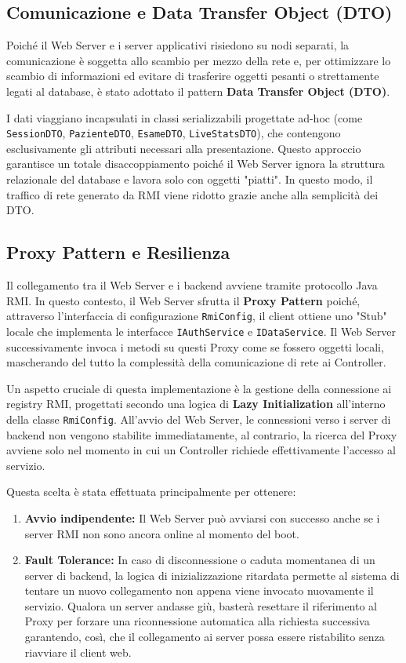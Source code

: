 \subsection{Comunicazione e Data Transfer Object (DTO)}
Poiché il Web Server e i server applicativi risiedono su nodi separati, la comunicazione è soggetta allo scambio per mezzo della rete e, per ottimizzare lo scambio di informazioni ed evitare di trasferire oggetti pesanti o strettamente legati al database, è stato adottato il pattern \textbf{Data Transfer Object (DTO)}. 

I dati viaggiano incapsulati in classi serializzabili progettate ad-hoc (come \texttt{SessionDTO}, \texttt{PazienteDTO}, \texttt{EsameDTO}, \texttt{LiveStatsDTO}), che contengono esclusivamente gli attributi necessari alla presentazione. Questo approccio garantisce un totale disaccoppiamento poiché il Web Server ignora la struttura relazionale del database e lavora solo con oggetti "piatti". In questo modo, il traffico di rete generato da RMI viene ridotto grazie anche alla semplicità dei DTO.

\subsection{Proxy Pattern e Resilienza}
Il collegamento tra il Web Server e i backend avviene tramite protocollo Java RMI. In questo contesto, il Web Server sfrutta il \textbf{Proxy Pattern} poiché, attraverso l'interfaccia di configurazione \texttt{RmiConfig}, il client ottiene uno "Stub" locale che implementa le interfacce \texttt{IAuthService} e \texttt{IDataService}. Il Web Server successivamente invoca i metodi su questi Proxy come se fossero oggetti locali, mascherando del tutto la complessità della comunicazione di rete ai Controller.

Un aspetto cruciale di questa implementazione è la gestione della connessione ai registry RMI, progettati secondo una logica di \textbf{Lazy Initialization} all'interno della classe \texttt{RmiConfig}. All'avvio del Web Server, le connessioni verso i server di backend non vengono stabilite immediatamente, al contrario, la ricerca del Proxy avviene solo nel momento in cui un Controller richiede effettivamente l'accesso al servizio. 

Questa scelta è stata effettuata principalmente per ottenere:
\begin{enumerate}
    \item \textbf{Avvio indipendente:} Il Web Server può avviarsi con successo anche se i server RMI non sono ancora online al momento del boot.
    \item \textbf{Fault Tolerance:} In caso di disconnessione o caduta momentanea di un server di backend, la logica di inizializzazione ritardata permette al sistema di tentare un nuovo collegamento non appena viene invocato nuovamente il servizio. Qualora un server andasse giù, basterà resettare il riferimento al Proxy per forzare una riconnessione automatica alla richiesta successiva garantendo, così, che il collegamento ai server possa essere ristabilito senza riavviare il client web.
\end{enumerate}

